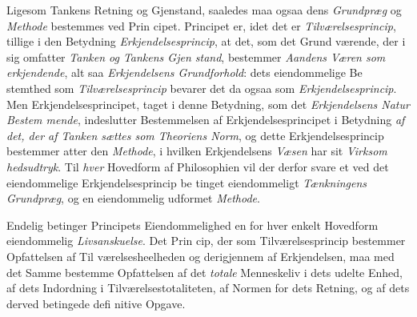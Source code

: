 Ligesom Tankens Retning og Gjenstand, saaledes maa
ogsaa dens \emph{Grundpræg} og \emph{Methode} bestemmes ved Prin\-%
cipet. Principet er, idet det er \emph{Tilværelsesprincip}, tillige i
den Betydning \emph{Erkjendelsesprincip}, at det, som det Grund\-%
værende, der i sig omfatter \emph{Tanken og Tankens Gjen\-%
stand}, bestemmer \emph{Aandens Væren som erkjendende}, alt\-%
saa \emph{Erkjendelsens Grundforhold}: dets eiendommelige Be\-%
stemthed som \emph{Tilværelsesprincip} bevarer det da ogsaa som
\emph{Erkjendelsesprincip}. Men Erkjendelsesprincipet, taget i
denne Betydning, som det \emph{Erkjendelsens Natur Bestem\-%
mende}, indeslutter Bestemmelsen af Erkjendelsesprincipet i
Betydning \emph{af det, der af Tanken sættes som Theoriens
Norm}, og dette Erkjendelsesprincip bestemmer atter den
\emph{Methode}, i hvilken Erkjendelsens \emph{Væsen} har sit \emph{Virksom\-%
hedsudtryk}. Til \emph{hver} Hovedform af Philosophien vil der
derfor svare et ved det eiendommelige Erkjendelsesprincip be\-%
tinget eiendommeligt \emph{Tænkningens Grundpræg}, og en
eiendommelig udformet \emph{Methode}.

Endelig betinger Principets Eiendommelighed en for hver
enkelt Hovedform eiendommelig \emph{Livsanskuelse}. Det Prin\-%
cip, der som Tilværelsesprincip bestemmer Opfattelsen af Til\-%
værelsesheelheden og derigjennem af Erkjendelsen, maa med
det Samme bestemme Opfattelsen af det \emph{totale} Menneskeliv
i dets udelte Enhed, af dets Indordning i Tilværelsestotaliteten,
af Normen for dets Retning, og af dets derved betingede defi\-%
nitive Opgave.

